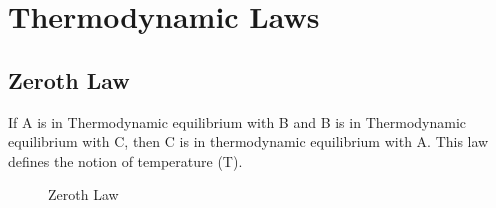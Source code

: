 \section{Thermodynamic Laws}
\subsection{Zeroth Law }
\begin{definition}
    If A is in Thermodynamic equilibrium with B and B is in Thermodynamic equilibrium with C, then C is in thermodynamic equilibrium with A. This law defines the notion of temperature (T).
    \begin{figure}[H]
        \centering
        \caption{Zeroth Law}
        \label{fig:zeroth_law}
    \end{figure}
\end{definition}
